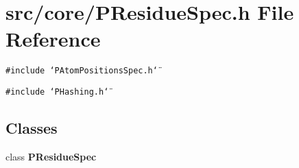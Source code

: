 \section{src/core/PResidue\-Spec.h File Reference}
\label{PResidueSpec_8h}


{\tt \#include \char`\"{}PAtom\-Positions\-Spec.h\char`\"{}}\par
{\tt \#include \char`\"{}PHashing.h\char`\"{}}\par
\subsection*{Classes}
\begin{CompactItemize}
\item 
class {\bf PResidue\-Spec}
\end{CompactItemize}
